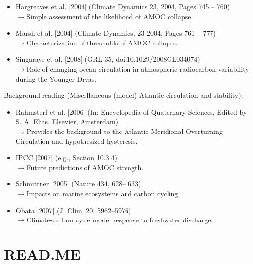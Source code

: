 \documentclass[11pt,fleqn]{book} %
\begin{document}
\vspace{2mm}
\begin{itemize}
\item Hargreaves et al. [2004] (Climate Dynamics 23, 2004, Pages 745 – 760)
\\\(\rightarrow\)Simple assessment of the likelihood of AMOC collapse.
\item Marsh et al. [2004] (Climate Dynamics, 23 2004, Pages 761 – 777)
\\\(\rightarrow\)Characterization of thresholds of AMOC collapse.
\item Singaraye et al. [2008] (GRL 35, doi:10.1029/2008GL034074)
\\\(\rightarrow\)Role of changing ocean circulation in atmospheric radiocarbon variability during the Younger Dryas.
\end{itemize}

\vspace{2mm}
\noindent Background reading (Miscellaneous (model) Atlantic circulation and stability):

\vspace{2mm}
\begin{itemize}
\item Rahmstorf et al. [2006] (In: Encyclopedia of Quaternary Sciences, Edited by S. A. Elias. Elsevier, Amsterdam)
\\\(\rightarrow\)Provides the background to the Atlantic Meridional Overturning Circulation and hypothesized hysteresis.
\item IPCC [2007] (e.g., Section 10.3.4)
\\\(\rightarrow\)Future predictions of AMOC strength.
\item Schmittner [2005] (Nature 434, 628– 633)
\\\(\rightarrow\)Impacts on marine ecosystems and carbon cycling.
\item Obata [2007] (J. Clim. 20, 5962–5976)
\\\(\rightarrow\)Climate-carbon cycle model response to freshwater discharge.
\end{itemize}


\newpage


\section*{READ.ME}
\end{document}
